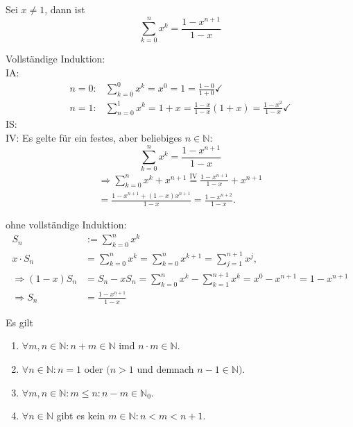\documentclass[../ana1.tex]{subfiles}
\begin{document}
\begin{satz}
	Sei $x\neq 1$, dann ist $$\sum_{k=0}^{n}x^k = \frac{1-x^{n+1}}{1-x}$$
\end{satz}
\begin{bew}
	Vollständige Induktion:\\
	IA:
	\begin{equation*}
		\begin{aligned}
			n=0: & \sum_{k=0}^{0} x^k = x^0 = 1 = \frac{1-0}{1+0}\checkmark                       \\
			n=1: & \sum_{n=0}^{1} x^k = 1+x = \frac{1-x}{1-x} (1+x) = \frac{1-x^2}{1-x}\checkmark
		\end{aligned}
	\end{equation*}
	IS:\\
	IV: Es gelte für ein festes, aber beliebiges $n\in\mathbb{N}$: $$\sum_{k=0}^{n} x^k = \frac{1-x^{n+1}}{1-x}$$
	\begin{equation}
		\begin{aligned}
			\Rightarrow \sum_{k=0}^{n} x^k + x^{n+1} \overset{\text{IV}}{=} \frac{1-x^{n+1}}{1-x} + x^{n+1} \\
			= \frac{1-x^{n+1} + (1-x)x^{n+1}}{1-x} = \frac{1-x^{n+2}}{1-x}.
		\end{aligned}
	\end{equation}
\end{bew}
\begin{bew} ohne vollständige Induktion:
	\[
		\begin{aligned}
			S_n                  & := \sum_{k=0}^{n} x^k                                                                 \\
			x\cdot S_n           & = \sum_{k=0}^{n} x^k = \sum_{k=0}^{n} x^{k+1} = \sum_{j=1}^{n+1} x^j,                 \\
			\Rightarrow (1-x)S_n & = S_n - x S_n = \sum_{k=0}^{n} x^k - \sum_{k=1}^{n+1} x^k = x^0 - x^{n+1} = 1-x^{n+1} \\
			\Rightarrow S_n      & = \frac{1-x^{n+1}}{1-x}
		\end{aligned}\]
\end{bew}
\begin{satz}
	Es gilt
	\begin{enumerate}
		\item $\forall m,n \in \mathbb{N}: n+m \in \mathbb{N}$ imd $n\cdot m \in \mathbb{N}$.
		\item $\forall n\in\mathbb{N}: n=1$ oder $(n>1$ und demnach $n-1 \in \mathbb{N})$.
		\item $\forall m,n\in\mathbb{N}:m\leq n:n-m\in\mathbb{N}_0$.
		\item $\forall n\in\mathbb{N}$ gibt es kein $m\in\mathbb{N}: n<m<n+1$.
	\end{enumerate}
\end{satz}
\end{document}
